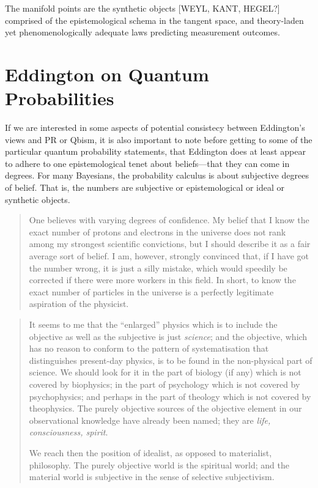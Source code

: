 The manifold points are the synthetic objects [WEYL, KANT, HEGEL?] comprised of the epistemological schema in the tangent space, and theory-laden yet phenomenologically adequate laws predicting measurement outcomes.  



\section{Eddington on Quantum Probabilities}

If we are interested in some aspects of potential consistecy between Eddington's views and PR or Qbism, it is also important to note before getting to some of the particular quantum probability statements, that Eddington does at least appear to adhere to one epistemological tenet about beliefs---that they can come in degrees.  For many Bayesians, the probability calculus is about subjective degrees of belief.  That is, the numbers are subjective or epistemological or ideal or synthetic objects.

\begin{quote}
    One believes with varying degrees of confidence.  My belief that I know the exact number of protons and electrons in the universe does not rank among my strongest scientific convictions, but I should describe it as a fair average sort of belief.  I am, however, strongly convinced that, if I have got the number wrong, it is just a silly mistake, which would speedily be corrected if there were more workers in this field.  In short, to know the exact number of particles in the universe is a perfectly legitimate aspiration of the physicist.  \citep[p. 171]{Eddington1939}
\end{quote}




\begin{quote}
    It seems to me that the ``enlarged'' physics which is to include the objective as well as the subjective is just \emph{science}; and the objective, which has no reason to conform to the pattern of systematisation that distinguishes present-day physics, is to be found in the non-physical part of science.  We should look for it in the part of biology (if any) which is not covered by biophysics; in the part of psychology which is not covered by psychophysics; and perhaps in the part of theology which is not covered by theophysics.  The purely objective sources of the objective element in our observational knowledge have already been named; they are \emph{life, consciousness, spirit}.
    
    We reach then the position of idealist, as opposed to materialist, philosophy.  The purely objective world is the spiritual world; and the material world is subjective in the sense of selective subjectivism.
    
    \citep[p. 68-69]{Eddington1939}
\end{quote}

